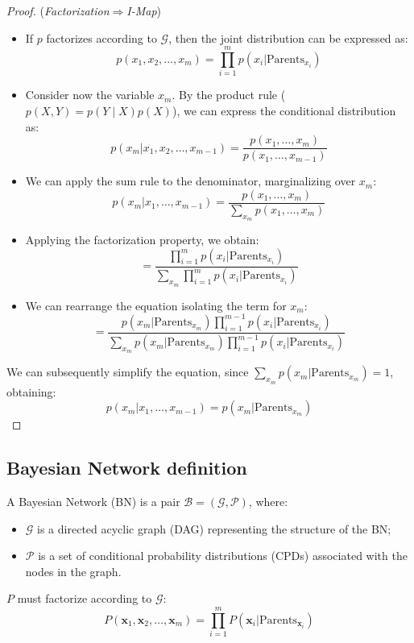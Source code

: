 \begin{proof}
(\textit{Factorization}$\Rightarrow$\textit{I-Map}) 
\begin{itemize}
    \item If $p$ factorizes according to $\mathcal{G}$, then the joint distribution can be expressed as:
    \[ p(x_1, x_2, \ldots, x_m) = \prod_{i=1}^{m} p(x_i | \text{Parents}_{x_i}) \]
    \item Consider now the variable $x_m$. By the product rule ($p(X, Y) = p(Y\mid X) p(X)$), we can express the conditional distribution as:
    \[ p(x_m | x_1, x_2, \ldots, x_{m-1}) = \frac{p(x_1,\ldots, x_m)}{p(x_1, \ldots, x_{m-1})} \]
    \item We can apply the sum rule to the denominator, marginalizing over $x_m$:
    \[ p(x_m | x_1, \ldots, x_{m-1}) = \frac{p(x_1,\ldots, x_m)}{\sum_{x_m} p(x_1,\ldots, x_m)} \]
    \item Applying the factorization property, we obtain:
    \[ = \frac{\prod_{i=1}^{m} p(x_i | \text{Parents}_{x_i})}{\sum_{x_m} \prod_{i=1}^{m} p(x_i | \text{Parents}_{x_i})} \]
    \item We can rearrange the equation isolating the term for $x_m$:
    \[ = \frac{p(x_m| \text{Parents}_{x_m}) \prod_{i=1}^{m-1} p(x_i | \text{Parents}_{x_i})}{\sum_{x_m} p(x_m| \text{Parents}_{x_m}) \prod_{i=1}^{m-1} p(x_i | \text{Parents}_{x_i})} \]
\end{itemize}
We can subsequently simplify the equation, since $\sum_{x_m} p(x_m| \text{Parents}_{x_m}) = 1$, obtaining:
\[
p(x_m | x_1, \ldots, x_{m-1}) = p(x_m| \text{Parents}_{x_m})
\]
\end{proof}

\subsection{Bayesian Network definition}
A Bayesian Network (BN) is a pair $\mathcal{B} = (\mathcal{G}, \mathcal{P})$, where:
\begin{itemize}
    \item $\mathcal{G}$ is a directed acyclic graph (DAG) representing the structure of the BN;
    \item $\mathcal{P}$ is a set of conditional probability distributions (CPDs) associated with the nodes in the graph.
\end{itemize}
$P$ must factorize according to $\mathcal{G}$:
\[ P(\boldsymbol{x}_1, \boldsymbol{x}_2, \ldots, \boldsymbol{x}_m) = \prod_{i=1}^{m} P(\boldsymbol{x}_i | \text{Parents}_{\boldsymbol{x}_i}) \]

